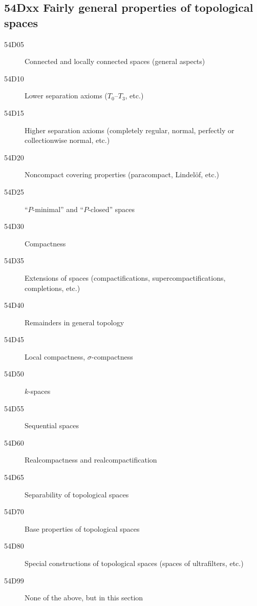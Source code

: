 \documentclass[letterpaper]{article}
\begin{document}
\subsection*{54Dxx  Fairly general properties of topological spaces}\label{54Dxx}
\begin{description}  
\item [54D05]\label{54D05} Connected and locally connected spaces (general aspects)
\item [54D10]\label{54D10} Lower separation axioms ($T_0$--$T_3$, etc.)
\item [54D15]\label{54D15} Higher separation axioms (completely regular, normal, perfectly or collectionwise normal, etc.)
\item [54D20]\label{54D20} Noncompact covering properties (paracompact, Lindel\"{o}f, etc.)
\item [54D25]\label{54D25} ``$P$-minimal'' and ``$P$-closed'' spaces
\item [54D30]\label{54D30} Compactness
\item [54D35]\label{54D35} Extensions of spaces (compactifications, supercompactifications, completions, etc.)
\item [54D40]\label{54D40} Remainders in general topology
\item [54D45]\label{54D45} Local compactness, $\sigma$-compactness
\item [54D50]\label{54D50} $k$-spaces
\item [54D55]\label{54D55} Sequential spaces
\item [54D60]\label{54D60} Realcompactness and realcompactification
\item [54D65]\label{54D65} Separability of topological spaces
\item [54D70]\label{54D70} Base properties of topological spaces
\item [54D80]\label{54D80} Special constructions of topological spaces (spaces of ultrafilters, etc.)
\item [54D99]\label{54D99} None of the above, but in this section
\end{description}
\end{document}
